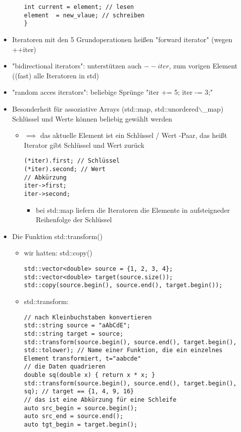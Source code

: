 \documentclass[a4paper]{scrartcl}
\theoremstyle{definition}
\theoremstyle{plain}
\theoremstyle{remark}
\theoremstyle{remark}
\begin{document}
\begin{itemize}
\begin{itemize}
\begin{verbatim}
int current = element; // lesen
element  = new_vlaue; // schreiben
}
\end{verbatim}
\end{itemize}
\item Iteratoren mit den 5 Grundoperationen heißen "forward iterator" (wegen ++iter)
\item "bidirectional iterators": unterstützen auch $--iter$, zum vorigen Element ((fast) alle Iteratoren in std)
\item "random acces iterators": beliebige Sprünge "iter += 5; iter -= 3;"
\item Besonderheit für assoziative Arrays (std::map, std::unordered$\backslash$\_map)
Schlüssel und Werte können beliebig gewählt werden
\begin{itemize}
\item $\implies$ das aktuelle Element ist ein Schlüssel / Wert -Paar, das heißt Iterator gibt Schlüssel und Wert zurück
\begin{verbatim}
(*iter).first; // Schlüssel
(*iter).second; // Wert
// Abkürzung
iter->first;
iter->second;
\end{verbatim}
\begin{itemize}
\item bei std::map liefern die Iteratoren die Elemente in aufsteigneder Reihenfolge der Schlüssel
\end{itemize}
\end{itemize}
\item Die Funktion std::transform()
\begin{itemize}
\item wir hatten: std::copy()
\begin{verbatim}
std::vector<double> source = {1, 2, 3, 4};
std::vector<double> target(source.size());
std::copy(source.begin(), source.end(), target.begin());
\end{verbatim}
\item std::transform:
\begin{verbatim}
// nach Kleinbuchstaben konvertieren
std::string source = "aAbCdE";
std::string target = source;
std::transform(source.begin(), source.end(), target.begin(), std::tolower); // Name einer Funktion, die ein einzelnes Element transformiert, t="aabcde"
// die Daten quadrieren
double sq(double x) { return x * x; }
std::transform(source.begin(), source.end(), target.begin(), sq); // target == {1, 4, 9, 16}
// das ist eine Abkürzung für eine Schleife
auto src_begin = source.begin();
auto src_end = source.end();
auto tgt_begin = target.begin();


\end{verbatim}
\end{itemize}
\end{itemize}
\end{document}
